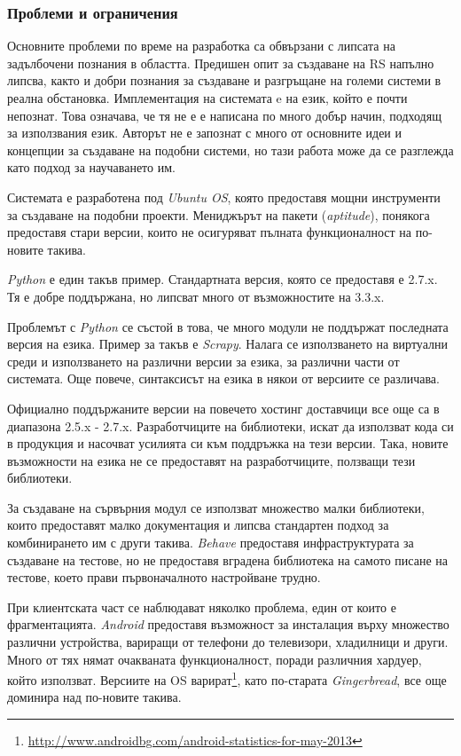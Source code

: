 \subsubsection{Проблеми и ограничения}

	Основните проблеми по време на разработка са обвързани с липсата на задълбочени познания в областта. Предишен опит за създаване на \ac{RS} напълно липсва, както и добри познания за създаване и разгръщане на големи системи в реална обстановка. Имплементация на системата e на език, който е почти непознат. Това означава, че тя не е е написана по много добър начин, подходящ за използвания език. Авторът не е запознат с много от основните идеи и концепции за създаване на подобни системи, но тази работа може да се разглежда като подход за научаването им.

	Системата е разработена под \emph{Ubuntu \ac{OS}}, която предоставя мощни инструменти за създаване на подобни проекти. Мениджърът на пакети (\emph{aptitude}), понякога предоставя стари версии, които не осигуряват пълната функционалност на по-новите такива.
	
	\emph{Python} е един такъв пример. Стандартната версия, която се предоставя е 2.7.x. Тя е добре поддържана, но липсват много от възможностите на 3.3.x. 
	
	Проблемът с \emph{Python} се състой в това, че много модули не поддържат последната версия на езика. Пример за такъв е \emph{Scrapy}. Налага се използването на виртуални среди и използването на различни версии за езика, за различни части от системата. Още повече, синтаксисът на езика в някои от версиите се различава.
	
	Официално поддържаните версии на повечето хостинг доставчици все още са в диапазона 2.5.x - 2.7.x. Разработчиците на библиотеки, искат да използват кода си в продукция и насочват усилията си към поддръжка на тези версии. Така, новите възможности на езика не се предоставят на разработчиците, ползващи тези библиотеки.
	
	За създаване на сървърния модул се използват множество малки библиотеки, които предоставят малко документация и липсва стандартен подход за комбинирането им с други такива. \emph{Behave} предоставя инфраструктурата за създаване на тестове, но не предоставя вградена библиотека на самото писане на тестове, което прави първоначалното настройване трудно.
	
	При клиентската част се наблюдават няколко проблема, един от които е фрагментацията. \emph{Android} предоставя възможност за инсталация върху множество различни устройства, вариращи от телефони до телевизори, хладилници и други. Много от тях нямат очакваната функционалност, поради различния хардуер, който използват. Версиите на \ac{OS} варират\footnote{\url{http://www.androidbg.com/android-statistics-for-may-2013}}, като по-старата \emph{Gingerbread}, все още доминира над по-новите такива.
	
